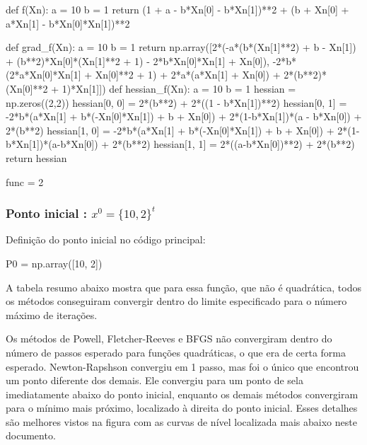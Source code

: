 \documentclass[10pt, a4paper]{article}
\begin{document}
\begin{python}
  def f(Xn):
    a = 10
    b = 1
    return (1 + a - b*Xn[0] - b*Xn[1])**2 + (b + Xn[0] + a*Xn[1] - b*Xn[0]*Xn[1])**2 
    
  def grad_f(Xn):
      a = 10
      b = 1
      return np.array([2*(-a*(b*(Xn[1]**2) + b - Xn[1]) + (b**2)*Xn[0]*(Xn[1]**2 + 1) - 2*b*Xn[0]*Xn[1] + Xn[0]),
                      -2*b*(2*a*Xn[0]*Xn[1] + Xn[0]**2 + 1) + 2*a*(a*Xn[1] + Xn[0]) + 2*(b**2)*(Xn[0]**2 + 1)*Xn[1]])
  def hessian_f(Xn):
      a = 10
      b = 1
      hessian = np.zeros((2,2))
      hessian[0, 0] = 2*(b**2) + 2*((1 - b*Xn[1])**2)
      hessian[0, 1] = -2*b*(a*Xn[1] + b*(-Xn[0]*Xn[1]) + b + Xn[0]) + 2*(1-b*Xn[1])*(a - b*Xn[0]) + 2*(b**2)
      hessian[1, 0] = -2*b*(a*Xn[1] + b*(-Xn[0]*Xn[1]) + b + Xn[0]) + 2*(1-b*Xn[1])*(a-b*Xn[0]) + 2*(b**2)
      hessian[1, 1] = 2*((a-b*Xn[0])**2) + 2*(b**2)
      return hessian
      
  func = 2
\end{python}

\subsubsection{Ponto inicial : $x^0 = \{10,2\}^t $}

Definição do ponto inicial no código principal:
\begin{python}
  P0 = np.array([10, 2])
\end{python}

A tabela resumo abaixo mostra que para essa função, que não é quadrática, todos os métodos conseguiram convergir dentro
do limite especificado para o número máximo de iterações.

Os métodos de Powell, Fletcher-Reeves e BFGS não convergiram dentro
do número de passos esperado para funções quadráticas, o que era de certa forma esperado.  Newton-Rapshson convergiu em
1 passo, mas foi o único que encontrou um ponto diferente dos demais. Ele convergiu para um ponto de sela imediatamente
abaixo do ponto inicial, enquanto os demais métodos convergiram para o mínimo mais próximo, localizado à direita
do ponto inicial. Esses detalhes são melhores vistos na figura com as curvas de nível localizada mais abaixo neste documento.
\end{document}
